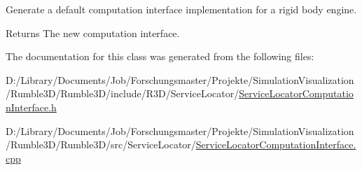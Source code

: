 Generate a default computation interface implementation for a rigid body engine. 

\begin{DoxyReturn}{Returns}
The new computation interface. 
\end{DoxyReturn}


The documentation for this class was generated from the following files\+:\begin{DoxyCompactItemize}
\item 
D\+:/\+Library/\+Documents/\+Job/\+Forschungsmaster/\+Projekte/\+Simulation\+Visualization/\+Rumble3\+D/\+Rumble3\+D/include/\+R3\+D/\+Service\+Locator/\mbox{\hyperlink{_service_locator_computation_interface_8h}{Service\+Locator\+Computation\+Interface.\+h}}\item 
D\+:/\+Library/\+Documents/\+Job/\+Forschungsmaster/\+Projekte/\+Simulation\+Visualization/\+Rumble3\+D/\+Rumble3\+D/src/\+Service\+Locator/\mbox{\hyperlink{_service_locator_computation_interface_8cpp}{Service\+Locator\+Computation\+Interface.\+cpp}}\end{DoxyCompactItemize}
